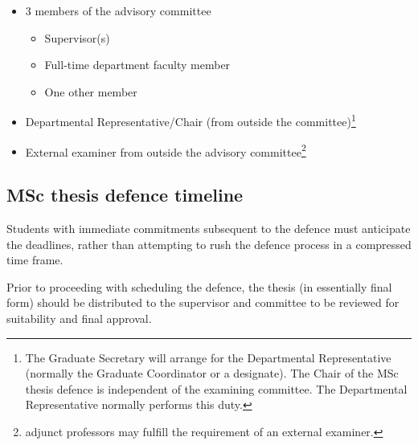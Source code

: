 \documentclass{article}
\begin{document}
\begin{itemize}
    \item 3 members of the advisory committee
        \begin{itemize}
            \item Supervisor(s)
            \item Full-time department faculty member
            \item One other member
        \end{itemize}

    \item Departmental Representative/Chair (from outside the
        committee)\footnote{The Graduate Secretary will arrange for the
        Departmental Representative (normally the Graduate Coordinator or a
        designate). The Chair of the MSc thesis defence is independent of the
        examining committee. The Departmental Representative normally performs
        this duty.}

    \item External examiner from outside the advisory
        committee\footnote{adjunct professors may fulfill the requirement of an
        external examiner.}

\end{itemize}


\subsection{MSc thesis defence timeline}

Students with immediate commitments subsequent to the defence must anticipate
the deadlines, rather than attempting to rush the defence process in a
compressed time frame.

Prior to proceeding with scheduling the defence, the thesis (in essentially
final form) should be distributed to the supervisor and committee to be
reviewed for suitability and final approval.
\end{document}
